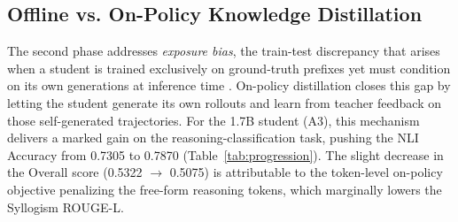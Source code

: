 \begin{table}[htbp]
\centering
\caption{Performance Progression Across Training Phases on the 325-sample Split-Test}
\label{tab:progression}
\end{table}

\subsection{Offline vs. On-Policy Knowledge Distillation}

The second phase addresses \textit{exposure bias}, the train-test discrepancy that arises when a student is trained exclusively on ground-truth prefixes yet must condition on its own generations at inference time \parencite{agarwal2024onpolicydistillationlanguagemodels, song2026surveyonpolicydistillationlarge}. On-policy distillation closes this gap by letting the student generate its own rollouts and learn from teacher feedback on those self-generated trajectories. For the 1.7B student (A3), this mechanism delivers a marked gain on the reasoning-classification task, pushing the NLI Accuracy from 0.7305 to 0.7870 (Table~\ref{tab:progression}). The slight decrease in the Overall score (0.5322 $\rightarrow$ 0.5075) is attributable to the token-level on-policy objective penalizing the free-form reasoning tokens, which marginally lowers the Syllogism ROUGE-L.


